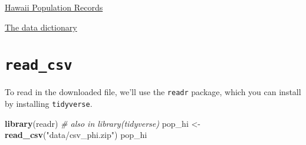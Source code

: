 \documentclass[]{book}
\newenvironment{Shaded}{\begin{snugshade}}{\end{snugshade}}
\newcommand{\KeywordTok}[1]{\textcolor[rgb]{0.13,0.29,0.53}{\textbf{{#1}}}}
\newcommand{\StringTok}[1]{\textcolor[rgb]{0.31,0.60,0.02}{{#1}}}
\newcommand{\CommentTok}[1]{\textcolor[rgb]{0.56,0.35,0.01}{\textit{{#1}}}}
\newcommand{\NormalTok}[1]{{#1}}
\theoremstyle{definition}
\theoremstyle{definition}
\theoremstyle{remark}
\begin{document}
\href{https://www2.census.gov/programs-surveys/acs/data/pums/2015/1-Year/csv_phi.zip}{Hawaii
Population Records}

\href{https://www2.census.gov/programs-surveys/acs/tech_docs/pums/data_dict/PUMSDataDict15.txt}{The
data dictionary}

\section{\texorpdfstring{\texttt{read\_csv}}{read\_csv}}\label{read_csv}

To read in the downloaded file, we'll use the \texttt{readr} package,
which you can install by installing \texttt{tidyverse}.

\begin{Shaded}
\begin{Highlighting}[]
\KeywordTok{library}\NormalTok{(readr) }\CommentTok{# also in library(tidyverse)}
\NormalTok{pop_hi <-}\StringTok{ }\KeywordTok{read_csv}\NormalTok{(}\StringTok{"data/csv_phi.zip"}\NormalTok{)}
\NormalTok{pop_hi}
\end{Highlighting}
\end{Shaded}
\end{document}
